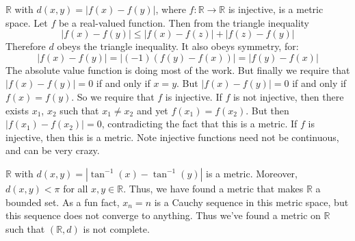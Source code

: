         \begin{example}
            $\mathbb{R}$ with
            $d(x,y)=|f(x)-f(y)|$, where
            $f:\mathbb{R}\rightarrow\mathbb{R}$
            is injective, is a metric space.
            Let $f$ be a real-valued function. Then
            from the triangle inequality
            \begin{equation*}
                |f(x)-f(y)|\leq|f(x)-f(z)|+|f(z)-f(y)|
            \end{equation*}
            Therefore $d$ obeys the triangle inequality.
            It also obeys symmetry, for:
            \begin{equation*}
                |f(x)-f(y)|=|(-1)(f(y)-f(x))|=|f(y)-f(x)|
            \end{equation*}
            The absolute value function is doing
            most of the work.
            But finally we require that
            $|f(x)-f(y)|=0$ if and only if
            $x=y$. But $|f(x)-f(y)|=0$ if and only
            if $f(x)=f(y)$. So we require that $f$
            is injective. If $f$ is not injective,
            then there exists $x_{1}$, $x_{2}$
            such that
            $x_{1}\ne{x_{2}}$ and yet
            $f(x_{1})=f(x_{2})$. But then
            $|f(x_{1})-f(x_{2})|=0$, contradicting the
            fact that this is a metric. If $f$ is
            injective, then this is a metric. Note
            injective functions need not be
            continuous, and can be very crazy.
        \end{example}
        \begin{example}
            $\mathbb{R}$ with
            $d(x,y)=|\tan^{-1}(x)-\tan^{-1}(y)|$ is a
            metric. Moreover, $d(x,y)<\pi$ for all
            $x,y\in\mathbb{R}$. Thus, we have found
            a metric that makes $\mathbb{R}$ a bounded
            set. As a fun fact, $x_{n}=n$ is a Cauchy
            sequence in this metric space, but
            this sequence does not converge to anything.
            Thus we've found a metric on
            $\mathbb{R}$ such that
            $(\mathbb{R},d)$ is not complete.
        \end{example}
